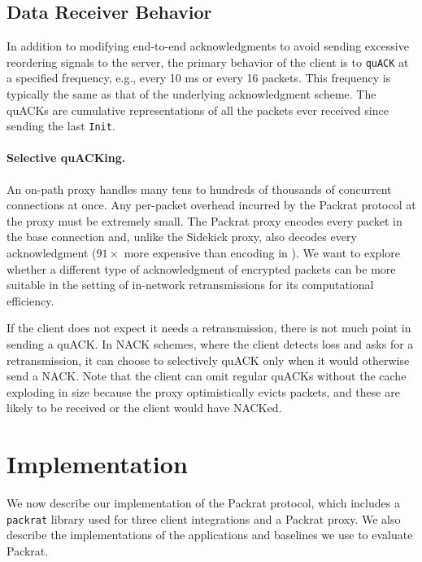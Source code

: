\subsection{Data Receiver Behavior}
\label{sec:packrat:protocol:receiver-behavior}

In addition to modifying end-to-end acknowledgments to avoid sending excessive
reordering signals to the server, the primary behavior of the client is
to \texttt{quACK} at a specified frequency, e.g., every 10 ms or every 16
packets. This frequency is typically the same as that of the underlying
acknowledgment scheme. The quACKs are cumulative representations of all the
packets ever received since sending the last \texttt{Init}.

\paragraph{Selective quACKing.}

An on-path proxy handles many tens to hundreds of thousands of concurrent
connections at once. Any per-packet overhead incurred by the Packrat protocol
at the proxy must be extremely small. The Packrat proxy encodes every packet in
the base connection and, unlike the Sidekick proxy, also decodes every
acknowledgment ($91\!\times$ more expensive than encoding in \cite
{yuan2024sidekick}). We want to explore whether a different type of
acknowledgment of encrypted packets can be more suitable in the setting of
in-network retransmissions for its computational efficiency.

If the client does not expect it needs a retransmission, there is not much point
in sending a quACK. In NACK schemes, where the client detects loss and asks for
a retransmission, it can choose to selectively quACK only when it would
otherwise send a NACK. Note that the client can omit regular quACKs without the
cache exploding in size because the proxy optimistically evicts packets, and
these are likely to be received or the client would have NACKed.\\

\section{Implementation}
\label{sec:packrat:implementation}

We now describe our implementation of the Packrat protocol, which includes
a \texttt{packrat} library used for three client integrations
and a Packrat proxy. We also describe the implementations of the
applications and baselines we use to evaluate Packrat.

